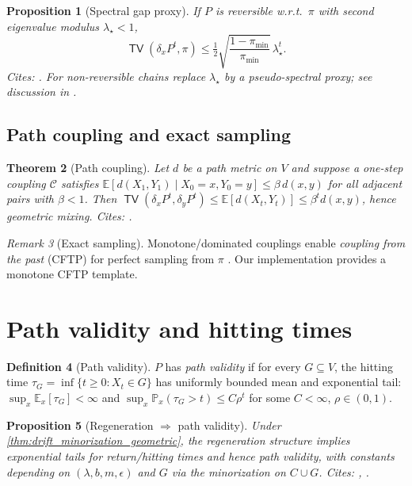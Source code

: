 \documentclass[11pt]{article}
\theoremstyle{plain}
\newtheorem{theorem}{Theorem}[section]
\newtheorem{proposition}[theorem]{Proposition}
\theoremstyle{definition}
\newtheorem{definition}[theorem]{Definition}
\theoremstyle{remark}
\newtheorem{remark}[theorem]{Remark}
\DeclareMathOperator{\TV}{\mathsf{TV}}
\newcommand{\EE}{\mathbb{E}}
\newcommand{\PP}{\mathbb{P}}
\newcommand{\1}{\mathds{1}}
\begin{document}
\begin{proposition}[Spectral gap proxy]\label{prop:spectral}
If $P$ is reversible w.r.t.\ $\pi$ with second eigenvalue modulus $\lambda_\star<1$,
\[
\TV(\delta_x P^t,\pi)\le \tfrac12 \sqrt{\frac{1-\pi_{\min}}{\pi_{\min}}}\,\lambda_\star^t.
\]
\textit{Cites:} \cite[Ch.~12]{LevinPeresWilmer2009}. For non-reversible chains replace $\lambda_\star$ by a pseudo-spectral proxy; see discussion in \cite[§19]{LevinPeresWilmer2009}.
\end{proposition}

\subsection{Path coupling and exact sampling}
\begin{theorem}[Path coupling]\label{thm:path_coupling}
Let $d$ be a path metric on $V$ and suppose a one-step coupling $\mathcal{C}$ satisfies
$\EE[d(X_1,Y_1)\mid X_0=x,Y_0=y]\le \beta\,d(x,y)$ for all adjacent pairs with $\beta<1$.
Then $\TV(\delta_x P^t,\delta_y P^t)\le \EE[d(X_t,Y_t)]\le \beta^t d(x,y)$, hence geometric mixing.
\textit{Cites:} \cite{BubleyDyer1997,LevinPeresWilmer2009}.
\end{theorem}

\begin{remark}[Exact sampling]
Monotone/dominated couplings enable \emph{coupling from the past} (CFTP) for perfect sampling from $\pi$ \cite{ProppWilson1996}. Our implementation provides a monotone CFTP template.
\end{remark}

\section{Path validity and hitting times}
\begin{definition}[Path validity]
$P$ has \emph{path validity} if for every $G\subseteq V$, the hitting time $\tau_G=\inf\{t\ge 0:X_t\in G\}$
has uniformly bounded mean and exponential tail: $\sup_x\EE_x[\tau_G]<\infty$ and
$\sup_x\PP_x(\tau_G>t)\le C\rho^t$ for some $C<\infty$, $\rho\in(0,1)$.
\end{definition}

\begin{proposition}[Regeneration $\Rightarrow$ path validity]\label{prop:pathvalidity}
Under \cref{thm:drift_minorization_geometric}, the regeneration structure implies exponential tails for return/hitting times and hence path validity, with constants depending on $(\lambda,b,m,\epsilon)$ and $G$ via the minorization on $C\cup G$. \textit{Cites:} \cite[Ch.~15]{MeynTweedie2009}, \cite{RobertsRosenthal2004}.
\end{proposition}
\end{document}
